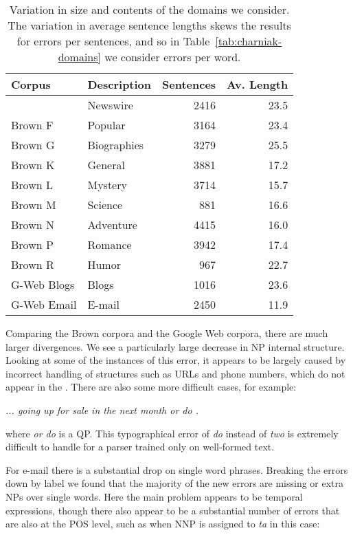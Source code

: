\begin{table}
\begin{center}
\begin{tabular}{|llrr|}
	\hline
		Corpus & Description & Sentences & Av. Length \\
	\hline
	\hline
		\wsj 23 & Newswire & 2416 & 23.5 \\
		Brown F & Popular & 3164 & 23.4 \\
		Brown G & Biographies & 3279 & 25.5 \\
		Brown K & General & 3881 & 17.2 \\
		Brown L & Mystery & 3714 & 15.7 \\
		Brown M & Science & 881 & 16.6 \\
		Brown N & Adventure & 4415 & 16.0 \\
		Brown P & Romance & 3942 & 17.4 \\
		Brown R & Humor & 967 & 22.7 \\
		G-Web Blogs & Blogs & 1016 & 23.6 \\
		G-Web Email & E-mail & 2450 & 11.9 \\
	\hline
\end{tabular}
\caption[Variation in size and contents of the domains we consider.]{ \label{tab:domain-info}
	Variation in size and contents of the domains we consider.	The variation in
	average sentence lengths skews the results for errors per sentences, and so
	in Table~\ref{tab:charniak-domains} we consider errors per word.
}
\end{center}
\end{table}

Comparing the Brown corpora and the Google Web corpora, there are much larger
divergences.  We see a particularly large decrease in NP internal structure.
Looking at some of the instances of this error, it appears to be largely caused
by incorrect handling of structures such as URLs and phone numbers, which do
not appear in the \ptb.  There are also some more difficult cases, for example:

\vspace{3mm}
\emph{... going up for sale in the next month or do .}
\vspace{3mm}

\noindent where \emph{or do} is a QP.
This typographical error of \emph{do} instead of \emph{two} is extremely difficult to handle for a parser trained only on well-formed text.

For e-mail there is a substantial drop on single word phrases.  Breaking the
errors down by label we found that the majority of the new errors are missing
or extra NPs over single words.  Here the main problem appears to be temporal
expressions, though there also appear to be a substantial number of errors that
are also at the POS level, such as when NNP is assigned to \emph{ta} in this
case:

